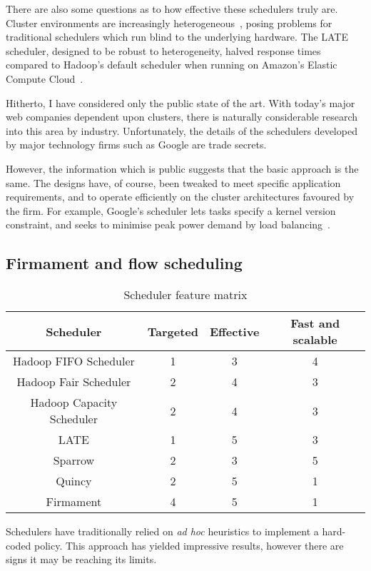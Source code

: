 There are also some questions as to how effective these schedulers truly are. Cluster environments are increasingly heterogeneous~\cite{Reiss:2012}, posing problems for traditional schedulers which run blind to the underlying hardware. The LATE scheduler, designed to be robust to heterogeneity, halved response times compared to Hadoop's default scheduler when running on Amazon's Elastic Compute Cloud~\cite{Zaharia:2008}.

Hitherto, I have considered only the public state of the art. With today's major web companies dependent upon clusters, there is naturally considerable research into this area by industry. Unfortunately, the details of the schedulers developed by major technology firms such as Google are trade secrets.

However, the information which is public suggests that the basic approach is the same. The designs have, of course, been tweaked to meet specific application requirements, and to operate efficiently on the cluster architectures favoured by the firm. For example, Google's scheduler lets tasks specify a kernel version constraint, and seeks to minimise peak power demand by load balancing~\cite[\S2.1]{Sharma:2011}.

\subsection{Firmament and flow scheduling}


\begin{table}
\begin{tabular}{c|c|c|c}
    Scheduler & Targeted & Effective & Fast and scalable \tabularnewline
    \hline
    Hadoop FIFO Scheduler & 1 & 3 & 4 \tabularnewline
    Hadoop Fair Scheduler & 2 & 4 & 3 \tabularnewline 
    Hadoop Capacity Scheduler & 2 & 4 & 3 \tabularnewline 
    LATE & 1 & 5 & 3 \tabularnewline 
    Sparrow & 2 & 3 & 5 \tabularnewline 
    \hline
    Quincy & 2 & 5 & 1 \tabularnewline 
    Firmament & 4 & 5 & 1 \tabularnewline 
\end{tabular}
\caption{Scheduler feature matrix}
\label{table:cluster-scheduler-feature-matrix}
\end{table}

Schedulers have traditionally relied on \textit{ad hoc} heuristics to implement a hard-coded policy. This approach has yielded impressive results, however there are signs it may be reaching its limits.

